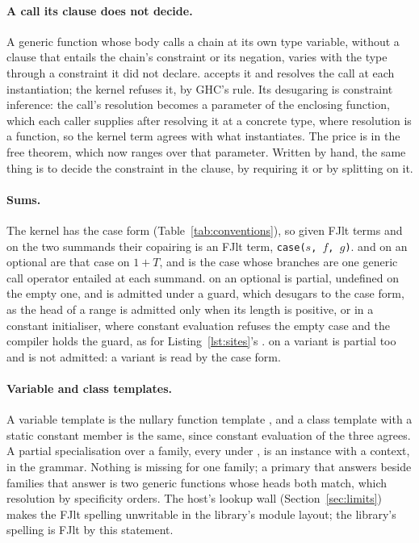 \paragraph{A call its clause does not decide.}
A generic function whose body calls a chain at its own type variable, without a clause that entails the chain's constraint or its negation, varies with the type through a constraint it did not declare.
\Cpp{} accepts it and resolves the call at each instantiation; the kernel refuses it, by GHC's rule.
Its desugaring is constraint inference: the call's resolution becomes a parameter of the enclosing function, which each caller supplies after resolving it at a concrete type, where resolution is a function, so the kernel term agrees with what \Cpp{} instantiates.
The price is in the free theorem, which now ranges over that parameter.
Written by hand, the same thing is to decide the constraint in the clause, by requiring it or by splitting on it.

\paragraph{Sums.}
The kernel has the case form (Table~\ref{tab:conventions}), so given FJlt terms  and  on the two summands their copairing is an FJlt term, \texttt{case(}$s$\texttt{, }$f$\texttt{, }$g$\texttt{)}.
 and  on an optional are that case on $1 + T$, and  is the case whose branches are one generic call operator entailed at each summand.
\cppinline{*} on an optional is partial, undefined on the empty one, and is admitted under a  guard, which desugars to the case form, as the head of a range is admitted only when its length is positive, or in a constant initialiser, where constant evaluation refuses the empty case and the compiler holds the guard, as for Listing~\ref{lst:sites}'s .
 on a variant is partial too and is not admitted: a variant is read by the case form.

\paragraph{Variable and class templates.}
A variable template  is the nullary function template , and a class template with a static constant member is the same, since constant evaluation of the three agrees.
A partial specialisation over a family, every  under \cppinline{+}, is an instance with a context, in the grammar.
Nothing is missing for one family; a primary that answers  beside families that answer  is two generic functions whose heads both match, which resolution by specificity orders.
The host's lookup wall (Section~\ref{sec:limits}) makes the FJlt spelling unwritable in the library's module layout; the library's spelling is FJlt by this statement.

